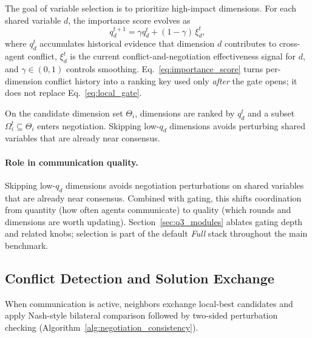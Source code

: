 \documentclass[conference]{IEEEtran}
\begin{document}
The goal of variable selection is to prioritize high-impact dimensions. For each shared variable $d$, the importance score evolves as
\begin{equation}
q_d^{t+1}=\gamma q_d^t+(1-\gamma)\,\xi_d^t,
\label{eq:importance_score}
\end{equation}
where $q_d^t$ accumulates historical evidence that dimension $d$ contributes to cross-agent conflict, $\xi_d^t$ is the current conflict-and-negotiation effectiveness signal for $d$, and $\gamma\in(0,1)$ controls smoothing. Eq.~\eqref{eq:importance_score} turns per-dimension conflict history into a ranking key used only \emph{after} the gate opens; it does not replace Eq.~\eqref{eq:local_gate}.

On the candidate dimension set $\Theta_i$, dimensions are ranked by $q_d^t$ and a subset $\Omega_i^t\subseteq\Theta_i$ enters negotiation. Skipping low-$q_d$ dimensions avoids perturbing shared variables that are already near consensus.

\paragraph{Role in communication quality.} Skipping low-$q_d$ dimensions avoids negotiation perturbations on shared variables that are already near consensus. Combined with gating, this shifts coordination from quantity (how often agents communicate) to quality (which rounds and dimensions are worth updating). Section~\ref{sec:q3_modules} ablates gating depth and related knobs; selection is part of the default \emph{Full} stack throughout the main benchmark.

\subsection{Conflict Detection and Solution Exchange}
When communication is active, neighbors exchange local-best candidates and apply Nash-style bilateral comparison followed by two-sided perturbation checking (Algorithm~\ref{alg:negotiation_consistency}).
\end{document}
